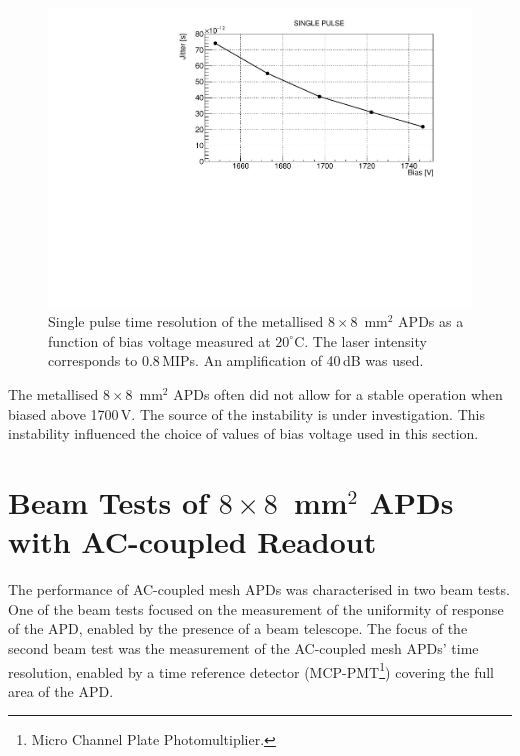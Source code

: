 \documentclass[review,number,sort&compress]{elsarticle}
\begin{document}
\begin{figure}
  \centering
  \includegraphics[width = 0.6 \columnwidth]{timeRes8x8metal}
  \caption{Single pulse time resolution of the metallised $8 \times 8$~mm$^2$ APDs as a function of bias voltage measured at $20^\circ$C. The laser intensity corresponds to 0.8\,MIPs. An amplification of 40\,dB was used.}
  \label{fig:timeRes8x8metal}
\end{figure}

The metallised $8 \times 8$~mm$^2$ APDs often did not allow for a stable operation when biased above 1700\,V.
The source of the instability is under investigation.
This instability influenced the choice of values of bias voltage used in this section.

\section{Beam Tests of $8 \times 8$~mm$^2$ APDs with AC-coupled Readout}
\label{sec:tb8x8}

The performance of AC-coupled mesh APDs was characterised in two beam tests.
One of the beam tests focused on the measurement of the uniformity of response of the APD, enabled by the presence of a beam telescope.
The focus of the second beam test was the measurement of the AC-coupled mesh APDs' time resolution, enabled by a time reference detector (MCP-PMT\footnote{Micro Channel Plate Photomultiplier.}) covering the full area of the APD.
\end{document}
